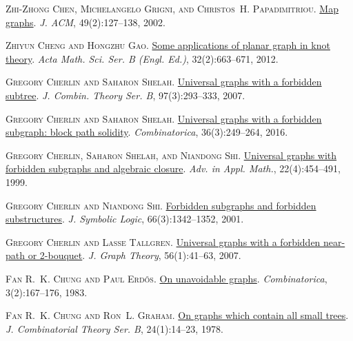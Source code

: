\documentclass[a4paper,11pt]{article}
\theoremstyle{plain}
\theoremstyle{definition}
\begin{document}
\textsc{Zhi-Zhong Chen, Michelangelo Grigni, and Christos~H. Papadimitriou}.
\newblock \href{https://doi.org/10.1145/506147.506148}{Map graphs}.
\newblock \emph{J. ACM}, 49(2):127--138, 2002.

\textsc{Zhiyun Cheng and Hongzhu Gao}.
\newblock \href{https://doi.org/10.1016/S0252-9602(12)60047-2}{Some
  applications of planar graph in knot theory}.
\newblock \emph{Acta Math. Sci. Ser. B (Engl. Ed.)}, 32(2):663--671, 2012.

\textsc{Gregory Cherlin and Saharon Shelah}.
\newblock \href{https://doi.org/10.1016/j.jctb.2006.05.008}{Universal graphs
  with a forbidden subtree}.
\newblock \emph{J. Combin. Theory Ser. B}, 97(3):293--333, 2007.

\textsc{Gregory Cherlin and Saharon Shelah}.
\newblock \href{https://doi.org/10.1007/s00493-014-3181-5}{Universal graphs
  with a forbidden subgraph: block path solidity}.
\newblock \emph{Combinatorica}, 36(3):249--264, 2016.

\textsc{Gregory Cherlin, Saharon Shelah, and Niandong Shi}.
\newblock \href{https://doi.org/10.1006/aama.1998.0641}{Universal graphs with
  forbidden subgraphs and algebraic closure}.
\newblock \emph{Adv. in Appl. Math.}, 22(4):454--491, 1999.

\textsc{Gregory Cherlin and Niandong Shi}.
\newblock \href{https://doi.org/10.2307/2695110}{Forbidden subgraphs and
  forbidden substructures}.
\newblock \emph{J. Symbolic Logic}, 66(3):1342--1352, 2001.

\textsc{Gregory Cherlin and Lasse Tallgren}.
\newblock \href{https://doi.org/10.1002/jgt.20245}{Universal graphs with a
  forbidden near-path or 2-bouquet}.
\newblock \emph{J. Graph Theory}, 56(1):41--63, 2007.

\textsc{Fan R.~K. Chung and Paul Erd\H{o}s}.
\newblock \href{https://doi.org/10.1007/BF02579290}{On unavoidable graphs}.
\newblock \emph{Combinatorica}, 3(2):167--176, 1983.

\textsc{Fan R.~K. Chung and Ron~L. Graham}.
\newblock \href{https://doi.org/10.1016/0095-8956(78)90072-2}{On graphs which
  contain all small trees}.
\newblock \emph{J. Combinatorial Theory Ser. B}, 24(1):14--23, 1978.
\end{document}
